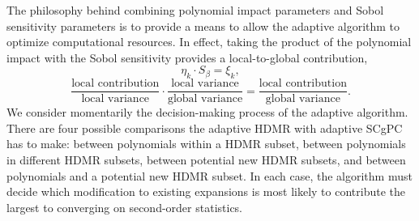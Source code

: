 The philosophy behind combining polynomial impact parameters and Sobol sensitivity parameters is to provide a
means to allow the adaptive algorithm to optimize computational resources.  In effect, taking the product of
the polynomial impact with the Sobol sensitivity provides a local-to-global contribution,
\begin{equation}
  \eta_k \cdot S_\beta = \xi_k,
\end{equation}
\begin{equation}
  \frac{\text{local contribution}}{\text{local variance}} \cdot \frac{\text{local variance}}{\text{global
        variance}} = \frac{\text{local contribution}}{\text{global variance}}.
\end{equation}
We consider momentarily the decision-making process of the adaptive algorithm.  There are four possible
comparisons the adaptive HDMR with adaptive SCgPC has to make: between polynomials within a HDMR subset,
between polynomials in different HDMR subsets, between potential new HDMR subsets, and between polynomials and
a potential new HDMR subset.  In each case, the algorithm must decide which modification to existing
expansions is most likely to contribute the largest to converging on second-order statistics.

